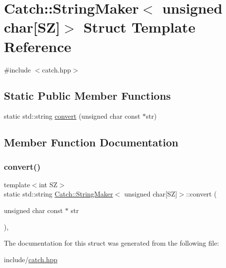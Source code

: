 \hypertarget{struct_catch_1_1_string_maker_3_01unsigned_01char[_s_z]_4}{}\section{Catch\+::String\+Maker$<$ unsigned char\mbox{[}SZ\mbox{]}$>$ Struct Template Reference}
\label{struct_catch_1_1_string_maker_3_01unsigned_01char[_s_z]_4}


{\ttfamily \#include $<$catch.\+hpp$>$}

\subsection*{Static Public Member Functions}
\begin{DoxyCompactItemize}
\item 
static std\+::string \mbox{\hyperlink{struct_catch_1_1_string_maker_3_01unsigned_01char[_s_z]_4_a590d64c72b0cc75c113f1eea95d52b66}{convert}} (unsigned char const $\ast$str)
\end{DoxyCompactItemize}


\subsection{Member Function Documentation}
\mbox{\label{struct_catch_1_1_string_maker_3_01unsigned_01char[_s_z]_4_a590d64c72b0cc75c113f1eea95d52b66}} 
\subsubsection{\texorpdfstring{convert()}{convert()}}
{\footnotesize\ttfamily template$<$int SZ$>$ \\
static std\+::string \mbox{\hyperlink{struct_catch_1_1_string_maker}{Catch\+::\+String\+Maker}}$<$ unsigned char\mbox{[}SZ\mbox{]}$>$\+::convert (\begin{DoxyParamCaption}\item[{unsigned char const $\ast$}]{str }\end{DoxyParamCaption})\hspace{0.3cm}{\ttfamily [inline]}, {\ttfamily [static]}}



The documentation for this struct was generated from the following file\+:\begin{DoxyCompactItemize}
\item 
include/\mbox{\hyperlink{catch_8hpp}{catch.\+hpp}}\end{DoxyCompactItemize}
